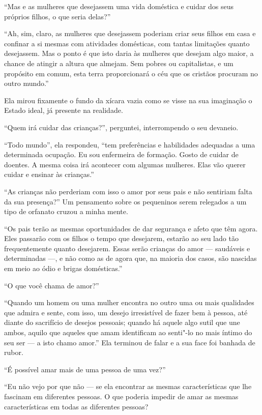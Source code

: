 ``Mas e as mulheres que desejassem uma vida doméstica e cuidar dos seus
próprios filhos, o que seria delas?''

``Ah, sim, claro, as mulheres que desejassem poderiam criar seus filhos
em casa e confinar a si mesmas com atividades domésticas, com tantas
limitações quanto desejassem. Mas o ponto é que isto daria às mulheres
que desejam algo maior, a chance de atingir a altura que almejam. Sem
pobres ou capitalistas, e um propósito em comum, esta terra
proporcionará o céu que os cristãos procuram no outro mundo.''

Ela mirou fixamente o fundo da xícara vazia como se visse na sua
imaginação o Estado ideal, já presente na realidade.

``Quem irá cuidar das crianças?'', perguntei, interrompendo o seu
devaneio.

``Todo mundo'', ela respondeu, ``tem preferências e habilidades
adequadas a uma determinada ocupação. Eu sou enfermeira de formação.
Gosto de cuidar de doentes. A mesma coisa irá acontecer com algumas
mulheres. Elas vão querer cuidar e ensinar às crianças.'' %

``As crianças não perderiam com isso o amor por seus pais e não
sentiriam falta da sua presença?'' Um pensamento sobre os pequeninos
serem relegados a um tipo de orfanato cruzou a minha mente.

``Os pais terão as mesmas oportunidades de dar segurança e afeto que têm
agora. Eles passarão com os filhos o tempo que desejarem, estarão ao seu
lado tão frequentemente quanto desejarem. Essas serão crianças do amor
--- saudáveis e determinadas ---, e não como as de agora que, na maioria
dos casos, são nascidas em meio ao ódio e brigas domésticas.''

``O que você chama de amor?''

``Quando um homem ou uma mulher encontra no outro uma ou mais qualidades
que admira e sente, com isso, um desejo irresistível de fazer bem à
pessoa, até diante do sacrifício de desejos pessoais; quando há aquele
algo sutil que une ambos, aquilo que aqueles que amam identificam ao
senti"-lo no mais íntimo do seu ser --- a isto chamo amor.'' Ela terminou
de falar e a sua face foi banhada de rubor.

``É possível amar mais de uma pessoa de uma vez?''

``Eu não vejo por que não --- se ela encontrar as mesmas características
que lhe fascinam em diferentes pessoas. O que poderia impedir de amar as
mesmas características em todas as diferentes pessoas?

